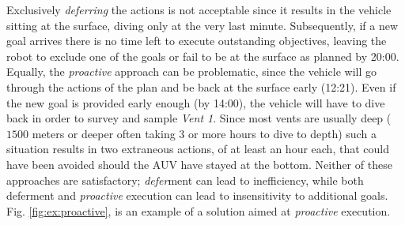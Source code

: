 


Exclusively {\em deferring} the actions is not acceptable since it
results in the vehicle sitting at the surface, diving only at the very
last minute. Subsequently, if a new goal arrives there is no time left
to execute outstanding objectives, leaving the robot to exclude one of
the goals or fail to be at the surface as planned by 20:00. Equally,
the {\em proactive} approach can be problematic, since the vehicle
will go through the actions of the plan and be back at the surface
early (12:21). Even if the new goal is provided early enough (by
14:00), the vehicle will have to dive back in order to survey and
sample {\em Vent 1}.  Since most vents are usually deep ($1500$ meters
or deeper often taking $3$ or more hours to dive to depth) such a
situation results in two extraneous actions, of at least an hour each,
that could have been avoided should the AUV have stayed at the bottom.
Neither of these approaches are satisfactory; {\em defer}ment can lead
to inefficiency, while both deferment and \emph{proactive} execution
can lead to insensitivity to additional
goals. Fig. \ref{fig:ex:proactive}, is an example of a solution aimed
at \emph{proactive} execution.


